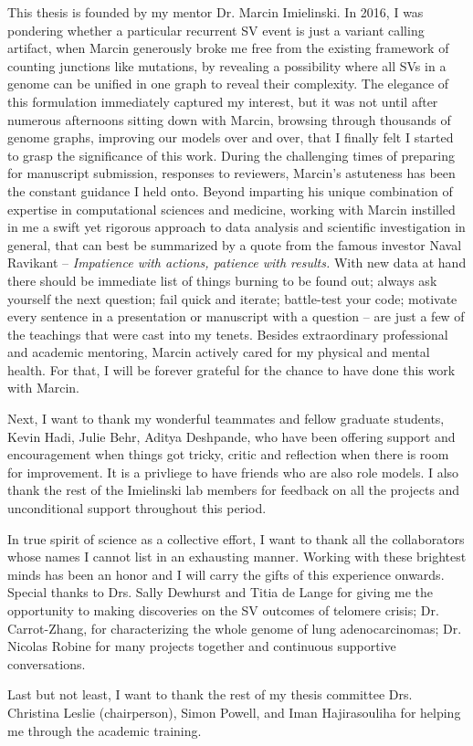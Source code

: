 \documentclass[phd,tocprelim]{cornell}
\begin{document}
\begin{acknowledgements}
    This thesis is founded by my mentor Dr. Marcin Imielinski. In 2016, I was pondering whether a particular recurrent SV event is just a variant calling artifact, when Marcin generously broke me free from the existing framework of counting junctions like mutations, by revealing a possibility where all SVs in a genome can be unified in one graph to reveal their complexity. The elegance of this formulation immediately captured my interest, but it was not until after numerous afternoons sitting down with Marcin, browsing through thousands of genome graphs, improving our models over and over, that I finally felt I started to grasp the significance of this work. During the challenging times of preparing for manuscript submission, responses to reviewers, Marcin's astuteness has been the constant guidance I held onto. Beyond imparting his unique combination of expertise in computational sciences and medicine, working with Marcin instilled in me a swift yet rigorous approach to data analysis and scientific investigation in general, that can best be summarized by a quote from the famous investor Naval Ravikant -- \textit{Impatience with actions, patience with results.} With new data at hand there should be immediate list of things burning to be found out; always ask yourself the next question; fail quick and iterate; battle-test your code; motivate every sentence in a presentation or manuscript with a question -- are just a few of the teachings that were cast into my tenets. Besides extraordinary professional and academic mentoring, Marcin actively cared for my physical and mental health. For that, I will be forever grateful for the chance to have done this work with Marcin.
    
    Next, I want to thank my wonderful teammates and fellow graduate students, Kevin Hadi, Julie Behr, Aditya Deshpande, who have been offering support and encouragement when things got tricky, critic and reflection when there is room for improvement. It is a privliege to have friends who are also role models. I also thank the rest of the Imielinski lab members for feedback on all the projects and unconditional support throughout this period.

    In true spirit of science as a collective effort, I want to thank all the collaborators whose names I cannot list in an exhausting manner. Working with these brightest minds has been an honor and I will carry the gifts of this experience onwards. Special thanks to Drs. Sally Dewhurst and Titia de Lange for giving me the opportunity to making discoveries on the SV outcomes of telomere crisis; Dr. Carrot-Zhang, for characterizing the whole genome of lung adenocarcinomas; Dr. Nicolas Robine for many projects together and continuous supportive conversations.

    Last but not least, I want to thank the rest of my thesis committee Drs. Christina Leslie (chairperson), Simon Powell, and Iman Hajirasouliha for helping me through the academic training.
\end{acknowledgements}
\end{document}
